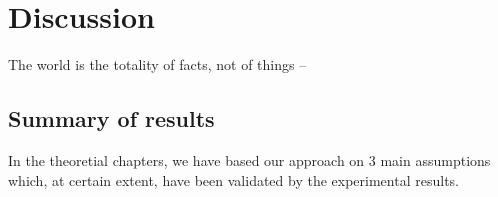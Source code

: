 \documentclass[
		twoside,openright,titlepage,numbers=noenddot,manychapters,
		headinclude,%
                footinclude=false,cleardoublepage=empty,
                BCOR=5mm,
		fontsize=11pt, %
                 enabledeprecatedfontcommands]{scrreprt}
\begin{document}
\cleardoublepage
\chapter{Discussion}
\thispagestyle{empty}
\label{ch_disc}



\begin{origquote}
 The world is the totality of facts, not of things --\cite{wittgenstein1921tractatus}
\end{origquote}






\section{Summary of results}

In the theoretial chapters, we have based our approach on 3 main assumptions which, at certain extent, have been validated by the experimental results.
\end{document}
